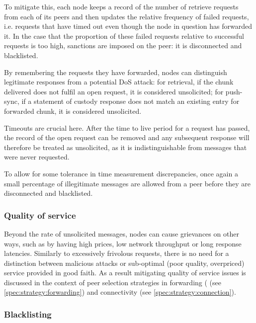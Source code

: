 To mitigate this, each node keeps a record of the number of retrieve requests from each of its peers and then updates the relative frequency of failed requests, i.e. requests that have timed out even though the node in question has forwarded it. In the case that the proportion of these failed requests relative to successful requests is too high, sanctions are imposed on the peer: it is disconnected and blacklisted.

% 
%

By remembering the requests they have forwarded, nodes can distinguish legitimate responses from a potential DoS attack: for retrieval, if the chunk delivered does not fulfil an open request, it is considered unsolicited; for push-sync, if a statement of custody response does not match an existing entry for forwarded chunk, it is considered unsolicited.

Timeouts are crucial here. After the time to live period for a request has passed, the record of the open request can be removed and any subsequent response will therefore be treated as unsolicited, as it is indistinguishable from messages that were never requested. 

To allow for some tolerance in time measurement discrepancies, once again a small percentage of illegitimate messages are allowed from a peer before they are disconnected and blacklisted.

\subsubsection{Quality of service}

Beyond the rate of unsolicited messages, nodes can cause grievances on other ways, such as by having high prices, low network throughput or long response latencies. Similarly to excessively frivolous requests, there is no need for a distinction between malicious attacks or sub-optimal (poor quality, overpriced) service provided in good faith. As a result mitigating quality of service issues is discussed in the context of peer selection strategies in forwarding ( (see \ref{spec:strategy:forwarding}) and connectivity (see \ref{spec:strategy:connection}).

\subsubsection{Blacklisting}

